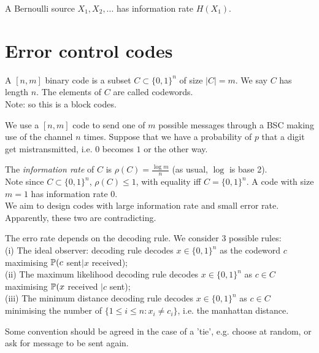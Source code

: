 \documentclass[a4paper]{article}
\begin{document}
\begin{coro}
A Bernoulli source $X_1,X_2,...$ has information rate $H(X_1)$.
\end{coro}

\newpage

\section{Error control codes}

\begin{defi}
A $[n,m]$ binary code is a subset $C\subset \{0,1\}^n$  of size $|C| = m$. We say $C$ has length $n$. The elements of $C$ are called codewords.\\
Note: so this is a block codes.

We use a $[n,m]$ code to send one of $m$ possible messages through a BSC making use of the channel $n$ times. Suppose that we have a probability of $p$ that a digit get mistransmitted, i.e. $0$ becomes $1$ or the other way.
\end{defi}

\begin{defi}
The \emph{information rate} of $C$ is $\rho(C) = \frac{\log m}{n}$ (as usual, $\log$ is base 2).\\
Note since $C \subset \{0,1\}^n$, $\rho(C) \leq 1$, with equality iff $C = \{0,1\}^n$. A code with size $m=1$ has information rate $0$.\\
We aim to design codes with large information rate and small error rate. Apparently, these two are contradicting.
\end{defi}

The erro rate depends on the decoding rule. We consider 3 possible rules:\\
(i) The ideal observer: decoding rule decodes $x \in \{0,1\}^n$ as the codeword $c$ maximising $\P(c$ sent$| x$ received);\\
(ii) The maximum likelihood decoding rule decodes $x \in \{0,1\}^n$ as $c \in C$ maximising $\P(x$ received $| c$ sent);\\
(iii) The minimum distance decoding rule decodes $x\in\{0,1\}^n$ as $c \in C$ minimising the number of $\{1\leq i\leq n: x_i \neq c_i\}$, i.e. the manhattan distance.

\begin{rem}
Some convention should be agreed in the case of a 'tie', e.g. choose at random, or ask for message to be sent again.
\end{rem}
\end{document}
